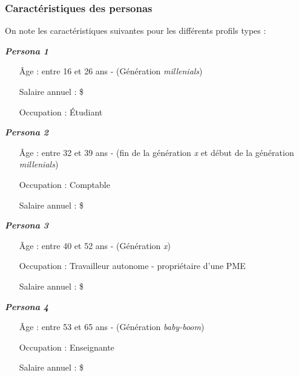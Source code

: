 \documentclass[11pt,french]{article}\usepackage[]{graphicx}\usepackage[]{color}
\newenvironment{userInfo}[1]
	{\begin{mdframed}
	\textcolor{NavyBlue}{\huge \raisebox{-3.5pt}{\faUser} 
	\hspace{0.5cm} \large\bfseries #1}\\[5pt]
	\normalsize
	\makebox[0.1\textwidth][l]{}	
	\begin{minipage}{10cm}}
	{	\end{minipage}
	\end{mdframed}}
\begin{document}
\subsubsection{Caractéristiques des personas}
On note les caractéristiques suivantes pour les différents profils types :

\begin{userInfo}{\color{MidnightBlue}\emph{Persona 1}
     \color{black}}
\label{per1}
\begin{itemize}
\item[Âge :] entre 16 et 26 ans - (Génération \emph{millenials})
\item[Salaire annuel :]  \$
\item[Occupation :] Étudiant
\end{itemize} 
\end{userInfo}

\begin{userInfo}{\color{MidnightBlue}\emph{Persona 2}
     \color{black}}
\label{per2}
\begin{itemize}
\item[Âge :] entre 32 et 39 ans - (fin de la génération \emph{x} et début de la génération \emph{millenials})
\item[Occupation :] Comptable
\item[Salaire annuel :]  \$
\end{itemize}
\end{userInfo}

\begin{userInfo}{\color{MidnightBlue}\emph{Persona 3}
     \color{black}}
\label{per3}
\begin{itemize}
\item[Âge :] entre 40 et 52 ans - (Génération \emph{x})
\item[Occupation :] Travailleur autonome - propriétaire d'une PME
\item[Salaire annuel :]  \$
\end{itemize}
\end{userInfo}

\begin{userInfo}{\color{MidnightBlue}\emph{Persona 4}
     \color{black}}
\label{per4}
\begin{itemize}
\item[Âge :] entre 53 et 65 ans - (Génération \emph{baby-boom})
\item[Occupation :] Enseignante
\item[Salaire annuel :]  \$
\end{itemize}
\end{userInfo}
\end{document}
